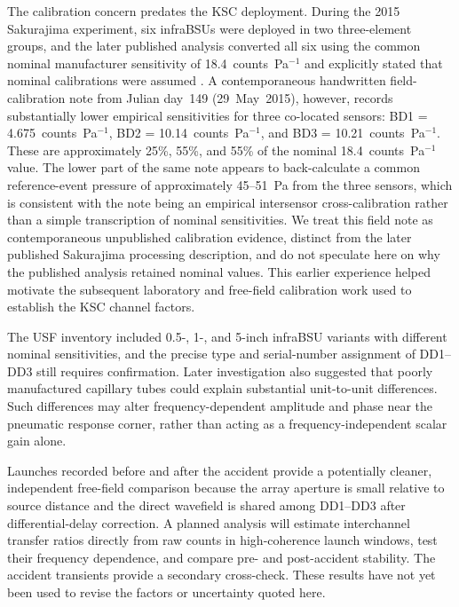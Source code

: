\documentclass[]{seismica}
\begin{document}
The calibration concern predates the KSC deployment. During the 2015
Sakurajima experiment, six infraBSUs were deployed in two three-element groups,
and the later published analysis converted all six using the common nominal
manufacturer sensitivity of 18.4~counts~Pa$^{-1}$ and explicitly stated that
nominal calibrations were assumed \citep{smith_sakurajima_2020}. A
contemporaneous handwritten field-calibration note from Julian day~149
(29~May~2015), however, records substantially lower empirical sensitivities for
three co-located sensors: BD1 = 4.675~counts~Pa$^{-1}$,
BD2 = 10.14~counts~Pa$^{-1}$, and BD3 = 10.21~counts~Pa$^{-1}$. These are
approximately 25\%, 55\%, and 55\% of the nominal 18.4~counts~Pa$^{-1}$
value. The lower part of the same note appears to back-calculate a common
reference-event pressure of approximately 45--51~Pa from the three sensors,
which is consistent with the note being an empirical intersensor
cross-calibration rather than a simple transcription of nominal sensitivities.
We treat this field note as contemporaneous unpublished calibration evidence,
distinct from the later published Sakurajima processing description, and do
not speculate here on why the published analysis retained nominal values.
This earlier experience helped motivate the subsequent laboratory and
free-field calibration work used to establish the KSC channel factors.

The USF inventory included 0.5-, 1-, and 5-inch infraBSU variants with
different nominal sensitivities, and the precise type and serial-number
assignment of DD1--DD3 still requires confirmation. Later investigation also
suggested that poorly manufactured capillary tubes could explain substantial
unit-to-unit differences. Such differences may alter frequency-dependent
amplitude and phase near the pneumatic response corner, rather than acting as
a frequency-independent scalar gain alone.

Launches recorded before and after the accident provide a potentially cleaner,
independent free-field comparison because the array aperture is small relative
to source distance and the direct wavefield is shared among DD1--DD3 after
differential-delay correction. A planned analysis will estimate interchannel
transfer ratios directly from raw counts in high-coherence launch windows,
test their frequency dependence, and compare pre- and post-accident stability.
The accident transients provide a secondary cross-check. These results have
not yet been used to revise the factors or uncertainty quoted here.
\end{document}
